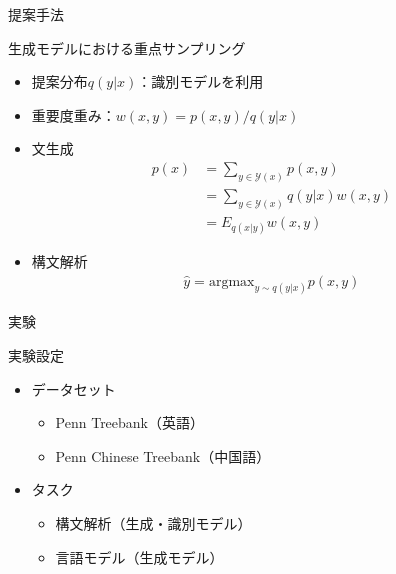 \documentclass[aspectratio=43,unicode,10pt]{beamer}
\begin{document}
\begin{frame}{提案手法}
  \begin{block}{生成モデルにおける重点サンプリング}
    \begin{itemize}
      \item 提案分布$q(y|x)$：識別モデルを利用
      \item 重要度重み：$w(x, y) = p(x, y) / q(y | x)$
      \item 文生成
        \begin{align*}
          p(x)
          & = \sum_{y \in \mathcal{Y}(x)} p(x, y) \\
          & = \sum_{y \in \mathcal{Y}(x)} q(y|x) w(x, y) \\
          & = E_{q(x|y)} w(x, y)
        \end{align*}
      \item 構文解析
        \begin{gather*}
          \hat{y} = \text{argmax}_{y \sim q(y|x)} p(x, y)
        \end{gather*}
    \end{itemize}
  \end{block}
\end{frame}

\begin{frame}{実験}
  \begin{block}{実験設定}
    \begin{itemize}
      \item データセット
        \begin{itemize}
          \item Penn Treebank（英語）
          \item Penn Chinese Treebank（中国語）
        \end{itemize}
      \item タスク
        \begin{itemize}
          \item 構文解析（生成・識別モデル）
          \item 言語モデル（生成モデル）
        \end{itemize}
    \end{itemize}
  \end{block}
\end{frame}
\end{document}
